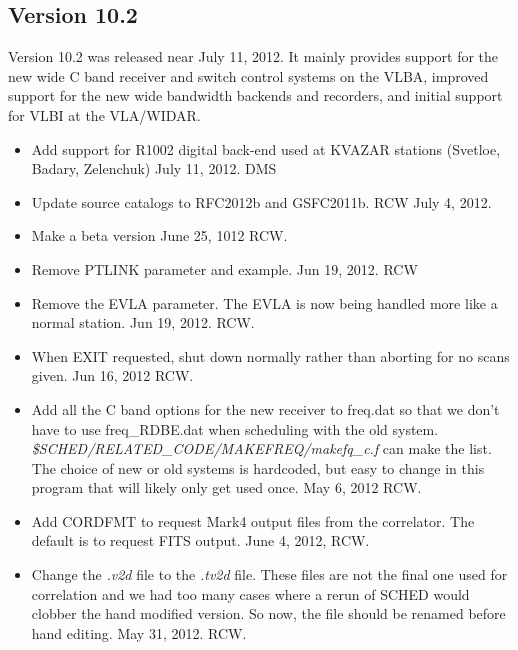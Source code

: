 \documentclass{report}
\begin{document}
\subsection{\label{SSEC:VER_10.2}Version 10.2}

Version 10.2 was released near July 11, 2012.  It mainly provides
support for the new wide C band receiver and switch control systems on
the VLBA, improved support for the new wide bandwidth backends and
recorders, and initial support for VLBI at the VLA/WIDAR.

\begin{itemize}



\item Add support for R1002 digital back-end used at KVAZAR stations
(Svetloe, Badary, Zelenchuk) July 11, 2012. DMS

\item Update source catalogs to RFC2012b and GSFC2011b.  RCW  July 4, 2012.

\item Make a beta version June 25, 1012  RCW.

\item Remove PTLINK parameter and example.  Jun 19, 2012. RCW

\item Remove the EVLA parameter.  The EVLA is now being handled more
like a normal station.  Jun 19, 2012.  RCW.

\item When EXIT requested, shut down normally rather than aborting
for no scans given.  Jun 16, 2012  RCW.

\item Add all the C band options for the new receiver to freq.dat
so that we don't have to use freq\_RDBE.dat when scheduling with the
old system.  {\sl \$SCHED/RELATED\_CODE/MAKEFREQ/makefq\_c.f} can make the
list.  The choice of new or old systems is hardcoded, but easy to
change in this program that will likely only get used once. 
May 6, 2012 RCW.

\item Add CORDFMT to request Mark4 output files from the correlator.
The default is to request FITS output.  June 4, 2012, RCW.

\item Change the {\sl .v2d} file to the {\sl .tv2d} file.  These files
are not the final one used for correlation and we had too many cases
where a rerun of SCHED would clobber the hand modified version.  So
now, the file should be renamed before hand editing.  May 31, 2012.  RCW.


\end{itemize}
\end{document}
